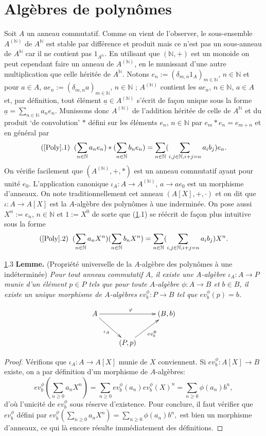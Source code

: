 \documentclass[a4paper, oneside, 12pt]{book}
\theoremstyle{theoremeStyle} %
\theoremstyle{definition} %
\newcommand{\N}{\mathbb{N}}
\begin{document}
\section{Algèbres de polynômes}\label{Poly}Soit $A$ un anneau commutatif.
Comme on vient de l'observer, le sous-ensemble $A^{(\N)}$ de $ A^\N$ est stable par différence et produit mais ce n'est pas un sous-anneau de $A^\N$ car il ne contient pas $1_{A^\N}$. En utilisant que $(\N,+)$ est un monoide on peut cependant    faire un anneau de $A^{(\N)}$, en le munissant d'une autre multiplication que celle héritée de $A^{\N}$. Notons  $e_n:=(\delta_{m,n}1_{A})_{m\in \N}$, $n\in \N$ et pour $a\in A$, $ae_n:=(\delta_{m,n}a)_{m\in \N}$, $n\in \N$ ; $A^{(\N)}$ contient les $ae_n$, $n\in \N$, $a\in A$ et, par définition,  tout élément $\underline{a}\in A^{(\N)}$ s'écrit de fa\c{c}on unique sous la forme $\underline{a}=\sum_{n\in \N}a_ne_n$. Munissons donc $A^{(\N)}$ de l'addition héritée de celle de $A^\N$ et du produit `de convolution' $*$ défini sur les éléments $e_n$, $n\in \N$ par
$e_m*e_n=e_{m+n} $ et en général par
$$(\ref{Poly}.1)\;\; (\sum_{n\in\N}a_ne_n) *(\sum_{n\in \N}b_ne_n)=\sum_{n\in \N}(\sum_{i,j\in \N, i+j=n}a_ib_j)e_n.$$
On vérifie facilement que $(A^{(\N)},+,*)$ est un anneau commutatif ayant pour unité $e_0$. L'application canonique $\iota_A:A\rightarrow A^{(\N)}$, $a\rightarrow ae_0  $  est un morphisme d'anneaux.
 On note traditionnellement cet anneau $(A[X],+,\cdot)$ et on dit que $\iota:A\rightarrow A[X]$ est la $A$-algèbre des polynômes à une inderminée. On pose aussi $X^n:=e_n$, $n\in \N$ et $1:=X^0$ de sorte que (\ref{Poly}.1) se réécrit de fa\c{c}on plus intuitive sous la forme
 $$(\ref{Poly}.2)\;\; (\sum_{n\in\N}a_nX^n)(\sum_{n\in \N}b_nX^n)=\sum_{n\in \N}(\sum_{i,j\in \N, i+j=n}a_ib_j)X^n.$$

 \ref{Poly}.3 \textbf{Lemme.} (Propriété universelle de la $A$-algèbre des polynômes à une indéterminée) \textit{Pour tout anneau commutatif $A$, il existe une $A$-algèbre $\iota_A: A\rightarrow P$ munie d'un élément $p\in P$ tels que pour toute $A$-algèbre $\phi: A\rightarrow B$ et  $b\in B$, il existe un unique  morphisme de $A$-algèbres $ev^\phi_b:P\rightarrow B$  tel que $ ev^\phi_b(p)=b$. }

	$$ \xymatrix{A \ar[rd]_{\iota_A} \ar[rr]^\varphi && (B, b) \\ & (P, p) \ar[ru]_{ev_b^\Phi}} $$

\begin{proof} Vérifions que $\iota_A:A\rightarrow A[X]$ munie de $X$ conviennent. Si $ev_b^\phi:A[X]\rightarrow B$ existe,  on a par définition d'un morphisme de $A$-algèbres:
$$ev^\phi_b(\sum_{n\geq 0}a_nX^n)=\sum_{n\geq 0}ev_b^\phi(a_n)ev_b^\phi(X)^n=\sum_{n\geq 0}\phi(a_n)b^n,$$
d'où l'unicité de $ev_b^\phi$ sous réserve d'existence.  Pour conclure, il faut vérifier que $ev_b^\phi$ défini par  $ev^\phi_b(\sum_{n\geq 0}a_nX^n)= \sum_{n\geq 0}\phi(a_n)b^n,$ est bien un morphisme d'anneaux, ce qui là encore résulte immédiatement des définitions.
\end{proof}
\end{document}
